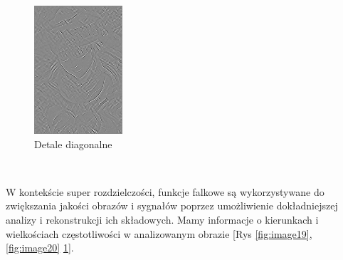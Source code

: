 \begin{figure}[ht]
\begin{minipage}[t]{0.3\linewidth}
        \includegraphics[width=\linewidth]{Rozdziały/02.Podstawy_teoretyczne/diagonal_detail.png}
        \caption{Detale diagonalne}
        \label{fig:image21}
    \end{minipage}
\end{figure}\

W kontekście super rozdzielczości, funkcje falkowe są wykorzystywane do zwiększania jakości obrazów i sygnałów poprzez umożliwienie dokładniejszej analizy i rekonstrukcji ich składowych. Mamy informacje o kierunkach i wielkościach częstotliwości w analizowanym obrazie [Rys \ref{fig:image19}, \ref{fig:image20} \ref{fig:image21}]. 


